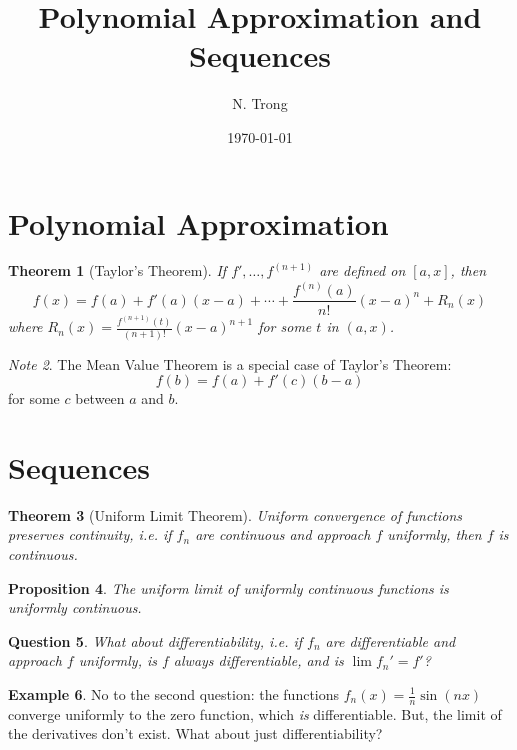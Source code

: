 \documentclass[12pt]{article}
\title{Polynomial Approximation and Sequences}
\author{N. Trong}
\date{\today}                                           %
\theoremstyle{plain}
\newtheorem{theorem}{Theorem}
\newtheorem{proposition}[theorem]{Proposition}
\newtheorem{question}[theorem]{Question}
\theoremstyle{definition}
\newtheorem{example}[theorem]{Example}
\theoremstyle{remark}
\newtheorem{note}[theorem]{Note}
\begin{document}
\maketitle


\part{Polynomial Approximation}

\begin{theorem}[Taylor's Theorem]
If $f', \ldots, f^{(n+1)}$ are defined on $[a, x]$, then 
$$f(x) = f(a) + f'(a)(x - a) + \cdots + \frac{f^{(n)}(a)}{n!}(x - a)^n + R_n(x)$$
where $R_n(x) = \frac{f^{(n+1)}(t)}{(n+1)!}(x - a)^{n+1}$ for some $t$ in $(a, x)$.
\end{theorem}

\begin{note}
The Mean Value Theorem is a special case of Taylor's Theorem:
$$f(b) = f(a) + f'(c)(b - a)$$
for some $c$ between $a$ and $b$.
\end{note}

\part{Sequences}

\begin{theorem}[Uniform Limit Theorem]
Uniform convergence of functions preserves continuity, i.e. if $f_n$ are continuous and approach $f$ uniformly, then $f$ is continuous.
\end{theorem}

\begin{proposition}
The uniform limit of uniformly continuous functions is uniformly continuous.
\end{proposition}

\begin{question}
What about differentiability, i.e. if $f_n$ are differentiable and approach $f$ uniformly, is $f$ always differentiable, and is $\lim f_n' = f'$? 
\end{question}

\begin{example}
No to the second question: the functions $f_n(x) = \frac{1}{n} \sin(nx)$ converge uniformly to the zero function, which \textit{is} differentiable. But, the limit of the derivatives don't exist. What about just differentiability? 
\end{example}
\end{document}
